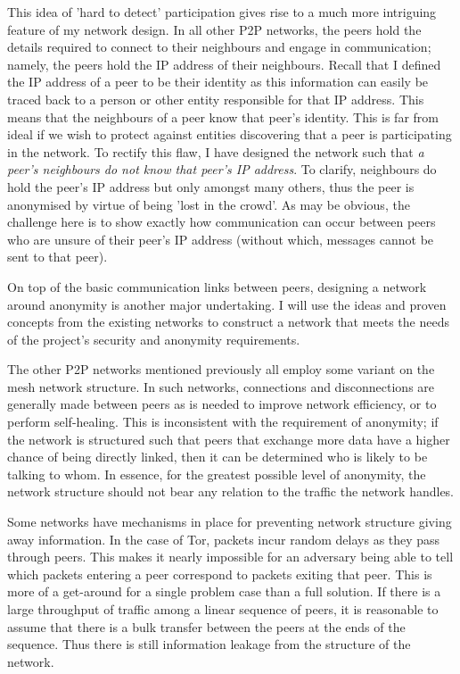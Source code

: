 \documentclass[ %
                    author={Luke Murray},
                supervisor={Dr. Simon Hollis},
                     title={Shadow Peer-to-Peer Networks},
                  subtitle={},
                    degree={MEng},
                      year={2013} ]{thesis}
\begin{document}
This idea of 'hard to detect' participation gives rise to a much more intriguing feature of my network design. In all other P2P networks, the peers hold the details required to connect to their neighbours and engage in communication; namely, the peers hold the IP address of their neighbours. Recall that I defined the IP address of a peer to be their identity as this information can easily be traced back to a person or other entity responsible for that IP address. This means that the neighbours of a peer know that peer's identity. This is far from ideal if we wish to protect against entities discovering that a peer is participating in the network. To rectify this flaw, I have designed the network such that {\em a peer's neighbours do not know that peer's IP address}. To clarify, neighbours do hold the peer's IP address but only amongst many others, thus the peer is anonymised by virtue of being 'lost in the crowd'. As may be obvious, the challenge here is to show exactly how communication can occur between peers who are unsure of their peer's IP address (without which, messages cannot be sent to that peer).

On top of the basic communication links between peers, designing a network around anonymity is another major undertaking. I will use the ideas and proven concepts from the existing networks to construct a network that meets the needs of the project's security and anonymity requirements.

The other P2P networks mentioned previously all employ some variant on the mesh network structure. In such networks, connections and disconnections are generally made between peers as is needed to improve network efficiency, or to perform self-healing. This is inconsistent with the requirement of anonymity; if the network is structured such that peers that exchange more data have a higher chance of being directly linked, then it can be determined who is likely to be talking to whom. In essence, for the greatest possible level of anonymity, the network structure should not bear any relation to the traffic the network handles.

Some networks have mechanisms in place for preventing network structure giving away information. In the case of Tor, packets incur random delays as they pass through peers. This makes it nearly impossible for an adversary being able to tell which packets entering a peer correspond to packets exiting that peer. This is more of a get-around for a single problem case than a full solution. If there is a large throughput of traffic among a linear sequence of peers, it is reasonable to assume that there is a bulk transfer between the peers at the ends of the sequence. Thus there is still information leakage from the structure of the network.
\end{document}
